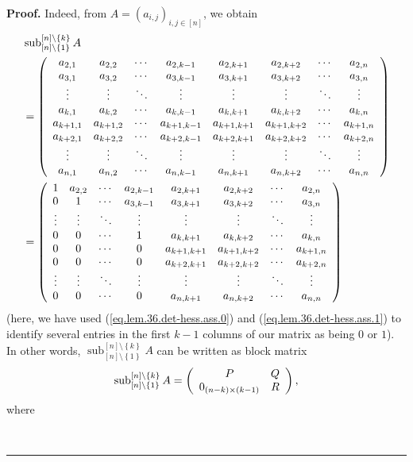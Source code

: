 \documentclass[numbers=enddot,12pt,final,onecolumn,notitlepage]{scrartcl}%
\theoremstyle{definition}
\newenvironment{proof}[1][Proof]{\noindent\textbf{#1.} }{\ \rule{0.5em}{0.5em}}
\begin{document}
\begin{enumerate}
\begin{proof}
Indeed, from $A=\left(  a_{i,j}\right)  _{i,j\in\left[  n\right]  }$, we
obtain%
\begin{align*}
&  \operatorname*{sub}\nolimits_{\left[  n\right]  \setminus\left\{
1\right\}  }^{\left[  n\right]  \setminus\left\{  k\right\}  }A\\
&  =\left(
\begin{array}
[c]{cccccccc}%
a_{2,1} & a_{2,2} & \cdots & a_{2,k-1} & a_{2,k+1} & a_{2,k+2} & \cdots &
a_{2,n}\\
a_{3,1} & a_{3,2} & \cdots & a_{3,k-1} & a_{3,k+1} & a_{3,k+2} & \cdots &
a_{3,n}\\
\vdots & \vdots & \ddots & \vdots & \vdots & \vdots & \ddots & \vdots\\
a_{k,1} & a_{k,2} & \cdots & a_{k,k-1} & a_{k,k+1} & a_{k,k+2} & \cdots &
a_{k,n}\\
a_{k+1,1} & a_{k+1,2} & \cdots & a_{k+1,k-1} & a_{k+1,k+1} & a_{k+1,k+2} &
\cdots & a_{k+1,n}\\
a_{k+2,1} & a_{k+2,2} & \cdots & a_{k+2,k-1} & a_{k+2,k+1} & a_{k+2,k+2} &
\cdots & a_{k+2,n}\\
\vdots & \vdots & \ddots & \vdots & \vdots & \vdots & \ddots & \vdots\\
a_{n,1} & a_{n,2} & \cdots & a_{n,k-1} & a_{n,k+1} & a_{n,k+2} & \cdots &
a_{n,n}%
\end{array}
\right) \\
&  =\left(
\begin{array}
[c]{cccccccc}%
1 & a_{2,2} & \cdots & a_{2,k-1} & a_{2,k+1} & a_{2,k+2} & \cdots & a_{2,n}\\
0 & 1 & \cdots & a_{3,k-1} & a_{3,k+1} & a_{3,k+2} & \cdots & a_{3,n}\\
\vdots & \vdots & \ddots & \vdots & \vdots & \vdots & \ddots & \vdots\\
0 & 0 & \cdots & 1 & a_{k,k+1} & a_{k,k+2} & \cdots & a_{k,n}\\
0 & 0 & \cdots & 0 & a_{k+1,k+1} & a_{k+1,k+2} & \cdots & a_{k+1,n}\\
0 & 0 & \cdots & 0 & a_{k+2,k+1} & a_{k+2,k+2} & \cdots & a_{k+2,n}\\
\vdots & \vdots & \ddots & \vdots & \vdots & \vdots & \ddots & \vdots\\
0 & 0 & \cdots & 0 & a_{n,k+1} & a_{n,k+2} & \cdots & a_{n,n}%
\end{array}
\right)
\end{align*}
(here, we have used (\ref{eq.lem.36.det-hess.ass.0}) and
(\ref{eq.lem.36.det-hess.ass.1}) to identify several entries in the first
$k-1$ columns of our matrix as being $0$ or $1$). In other words,
$\operatorname*{sub}\nolimits_{\left[  n\right]  \setminus\left\{  1\right\}
}^{\left[  n\right]  \setminus\left\{  k\right\}  }A$ can be written as block
matrix%
\[
\operatorname*{sub}\nolimits_{\left[  n\right]  \setminus\left\{  1\right\}
}^{\left[  n\right]  \setminus\left\{  k\right\}  }A=\left(
\begin{array}
[c]{cc}%
P & Q\\
0_{\left(  n-k\right)  \times\left(  k-1\right)  } & R
\end{array}
\right)  ,
\]
where


\end{proof}
\end{enumerate}
\end{document}
